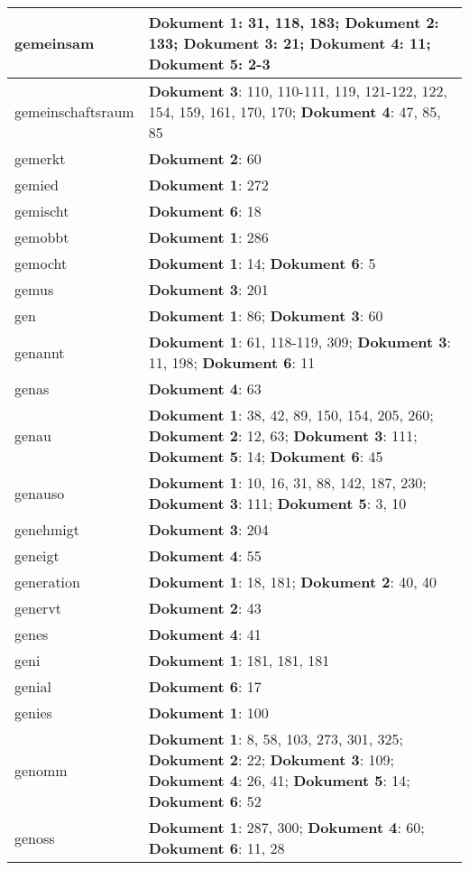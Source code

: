 \documentclass[a5paper]{article}
\begin{document}
\begin{longtable}[l]{|l|p{3in}|}
\hline
gemeinsam & \textbf{Dokument 1}: 31, 118, 183; \textbf{Dokument 2}: 133; \textbf{Dokument 3}: 21; \textbf{Dokument 4}: 11; \textbf{Dokument 5}: 2-3 \\
\hline
gemeinschaftsraum & \textbf{Dokument 3}: 110, 110-111, 119, 121-122, 122, 154, 159, 161, 170, 170; \textbf{Dokument 4}: 47, 85, 85 \\
\hline
gemerkt & \textbf{Dokument 2}: 60 \\
\hline
gemied & \textbf{Dokument 1}: 272 \\
\hline
gemischt & \textbf{Dokument 6}: 18 \\
\hline
gemobbt & \textbf{Dokument 1}: 286 \\
\hline
gemocht & \textbf{Dokument 1}: 14; \textbf{Dokument 6}: 5 \\
\hline
gemus & \textbf{Dokument 3}: 201 \\
\hline
gen & \textbf{Dokument 1}: 86; \textbf{Dokument 3}: 60 \\
\hline
genannt & \textbf{Dokument 1}: 61, 118-119, 309; \textbf{Dokument 3}: 11, 198; \textbf{Dokument 6}: 11 \\
\hline
genas & \textbf{Dokument 4}: 63 \\
\hline
genau & \textbf{Dokument 1}: 38, 42, 89, 150, 154, 205, 260; \textbf{Dokument 2}: 12, 63; \textbf{Dokument 3}: 111; \textbf{Dokument 5}: 14; \textbf{Dokument 6}: 45 \\
\hline
genauso & \textbf{Dokument 1}: 10, 16, 31, 88, 142, 187, 230; \textbf{Dokument 3}: 111; \textbf{Dokument 5}: 3, 10 \\
\hline
genehmigt & \textbf{Dokument 3}: 204 \\
\hline
geneigt & \textbf{Dokument 4}: 55 \\
\hline
generation & \textbf{Dokument 1}: 18, 181; \textbf{Dokument 2}: 40, 40 \\
\hline
genervt & \textbf{Dokument 2}: 43 \\
\hline
genes & \textbf{Dokument 4}: 41 \\
\hline
geni & \textbf{Dokument 1}: 181, 181, 181 \\
\hline
genial & \textbf{Dokument 6}: 17 \\
\hline
genies & \textbf{Dokument 1}: 100 \\
\hline
genomm & \textbf{Dokument 1}: 8, 58, 103, 273, 301, 325; \textbf{Dokument 2}: 22; \textbf{Dokument 3}: 109; \textbf{Dokument 4}: 26, 41; \textbf{Dokument 5}: 14; \textbf{Dokument 6}: 52 \\
\hline
genoss & \textbf{Dokument 1}: 287, 300; \textbf{Dokument 4}: 60; \textbf{Dokument 6}: 11, 28 \\

\end{longtable}
\end{document}
